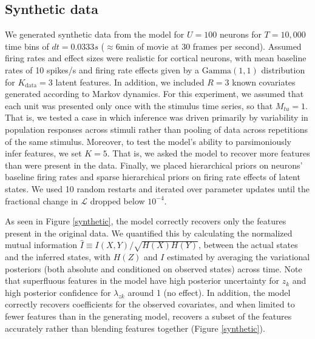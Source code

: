 \documentclass[10pt,letterpaper]{article}
\begin{document}
\subsection*{Synthetic data}
We generated synthetic data from the model for $U=100$ neurons for $T=10,000$ time bins of $dt=0.0333s$ ($\approx 6$min of movie at 30 frames per second). Assumed firing rates and effect sizes were realistic for cortical neurons, with mean baseline rates of 10 spikes/s and firing rate effects given by a $\text{Gamma}(1, 1)$ distribution for $K_{\text{data}}=3$ latent features. In addition, we included $R=3$ known covariates generated according to Markov dynamics. For this experiment, we assumed that each unit was presented only once with the stimulus time series, so that $M_{tu} = 1$. That is, we tested a case in which inference was driven primarily by variability in population responses across stimuli rather than pooling of data across repetitions of the same stimulus. Moreover, to test the model's ability to parsimoniously infer features, we set $K=5$. That is, we asked the model to recover more features than were present in the data. Finally, we placed hierarchical priors on neurons' baseline firing rates and sparse hierarchical priors on firing rate effects of latent states. We used 10 random restarts and iterated over parameter updates until the fractional change in $\mathcal{L}$ dropped below $10^{-4}$.

As seen in Figure \ref{synthetic}, the model correctly recovers only the features present in the original data. We quantified this by calculating the normalized mutual information $\hat{I}\equiv I(X, Y)/\sqrt{H(X)H(Y)}$, between the actual states and the inferred states, with $H(Z)$ and $I$ estimated by averaging the variational posteriors (both absolute and conditioned on observed states) across time. Note that superfluous features in the model have high posterior uncertainty for $z_k$ and high posterior confidence for $\lambda_{zk}$ around 1 (no effect). In addition, the model correctly recovers coefficients for the observed covariates, and when limited to fewer features than in the generating model, recovers a subset of the features accurately rather than blending features together (Figure \ref{synthetic}).
\end{document}
